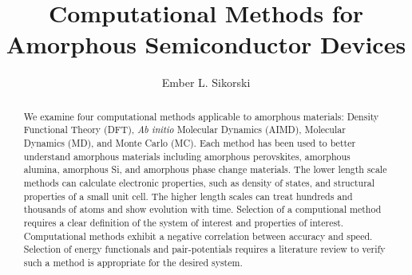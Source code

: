 \documentclass[3p,review,12pt]{elsarticle}
\begin{document}
\begin{frontmatter}
	\title{Computational Methods for Amorphous Semiconductor Devices}
	
	\author[boise]{Ember L. Sikorski}
	
	
	\address[boise]{Boise State University}
	
	\begin{abstract}

We examine four computational methods applicable to amorphous materials: Density Functional Theory (DFT), \textit{Ab initio} Molecular Dynamics (AIMD), Molecular Dynamics (MD), and Monte Carlo (MC). Each method has been used to better understand amorphous materials including amorphous perovskites, amorphous alumina, amorphous Si, and amorphous phase change materials. The lower length scale methods can calculate electronic properties, such as density of states, and structural properties of a small unit cell. The higher length scales can treat hundreds and thousands of atoms and show evolution with time. Selection of a computional method requires a clear definition of the system of interest and properties of interest. Computational methods exhibit a negative correlation between accuracy and speed. Selection of energy functionals and pair-potentials requires a literature review to verify such a method is appropriate for the desired system. 

	\end{abstract}
	
	
\end{frontmatter}
\tableofcontents
\end{document}
